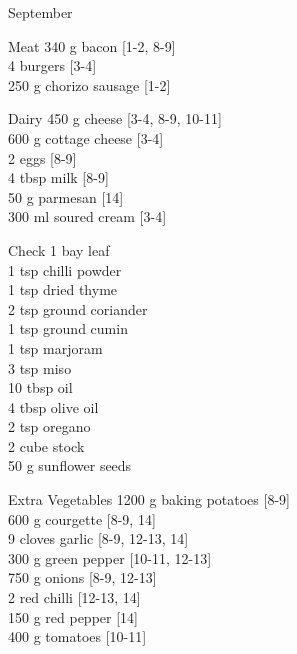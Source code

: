 \begin{menu}{September}
      \par\vfil %
      \begin{shoppinglist}{Meat}
      340 g bacon {\scriptsize[1-2, 8-9]}\\
      4  burgers {\scriptsize[3-4]}\\
      250 g chorizo sausage {\scriptsize[1-2]}\\
      \end{shoppinglist}%
      \begin{shoppinglist}{Dairy}
      450 g cheese {\scriptsize[3-4, 8-9, 10-11]}\\
      600 g cottage cheese {\scriptsize[3-4]}\\
      2  eggs {\scriptsize[8-9]}\\
      4 tbsp milk {\scriptsize[8-9]}\\
      50 g parmesan {\scriptsize[14]}\\
      300 ml soured cream {\scriptsize[3-4]}\\
      \end{shoppinglist}%
      \par\vfil %
      \vfil\clearpage %
      \begin{shoppinglist}{Check}
      1  bay leaf \\
      1 tsp chilli powder \\
      1 tsp dried thyme \\
      2 tsp ground coriander \\
      1 tsp ground cumin \\
      1 tsp marjoram \\
      3 tsp miso \\
      10 tbsp oil \\
      4 tbsp olive oil \\
      2 tsp oregano \\
      2 cube stock \\
      50 g sunflower seeds \\
      \end{shoppinglist}%
      \begin{shoppinglist}{Extra Vegetables}
      1200 g baking potatoes {\scriptsize[8-9]}\\
      600 g courgette {\scriptsize[8-9, 14]}\\
      9 cloves garlic {\scriptsize[8-9, 12-13, 14]}\\
      300 g green pepper {\scriptsize[10-11, 12-13]}\\
      750 g onions {\scriptsize[8-9, 12-13]}\\
      2  red chilli {\scriptsize[12-13, 14]}\\
      150 g red pepper {\scriptsize[14]}\\
      400 g tomatoes {\scriptsize[10-11]}\\
      \end{shoppinglist}%
      \par\vfil %
    \vfil\clearpage
  

\end{menu}
